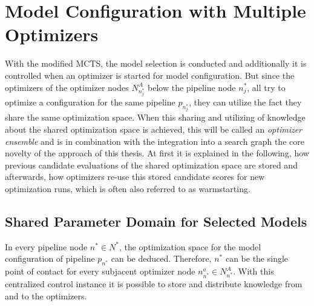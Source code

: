 \section{Model Configuration with Multiple Optimizers}
\label{sec:approach:configuration}
With the modified MCTS, the model selection is conducted and additionally it is controlled when an optimizer is started for model configuration.
But since the optimizers of the optimizer nodes $N^A_{n^*_j}$ below the pipeline node $n^*_j$, all try to optimize a configuration for the same pipeline $p_{n^*_j}$, they can utilize the fact they share the same optimization space.
When this sharing and utilizing of knowledge about the shared optimization space is achieved, this will be called an \textit{optimizer ensemble} and is in combination with the integration into a search graph the core novelty of the approach of this thesis.\newline
At first it is explained in the following, how previous candidate evaluations of the shared optimization space are stored and afterwards, how optimizers re-use this stored candidate scores for new optimization runs, which is often also referred to as warmstarting.

\subsection{Shared Parameter Domain for Selected Models}
\label{sec:approach:configuration:parameter}
In every pipeline node $n^* \in N^*$, the optimization space for the model configuration of pipeline $p_{n^*}$ can be deduced.
Therefore, $n^*$ can be the single point of contact for every subjacent optimizer node $n^{a}_{n^*} \in N^A_{n^*}$.
With this centralized control instance it is possible to store and distribute knowledge from and to the optimizers.

